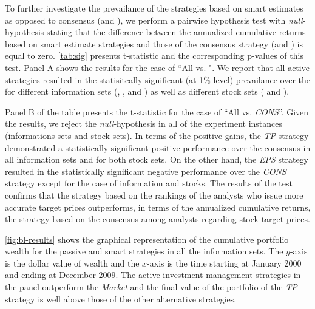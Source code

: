 \documentclass[a4paper,twoside,12pt,openright,notitlepage]{report}\usepackage[]{graphicx}\usepackage[]{color}
\begin{document}


To further investigate the prevailance  of the strategies based on smart estimates  as opposed to consensus (and \Market{}), we perform a pairwise hypothesis test with \emph{null}-hypothesis stating that the difference between the annualized cumulative returns based on smart estimate strategies and those of the consensus strategy (and \Market{}) is equal to zero. \ref{tab:sig} presents t-statistic and the corresponding p-values of this test. Panel A shows the results for the case of ``All vs. \Market{}". We report that all active strategies resulted in the statisitcally significant (at 1\% level) prevailance over the \Market{} for different information sets (\tr{}, \naive{}, and ) as well as different stock sets (\all{} and \same{}).

Panel B of the table presents the t-statistic for the case of ``All vs. \textit{CONS}''. Given the results, we reject the \emph{null}-hypothesis in all of the experiment instances (informations sets and stock sets). In terms of the positive gains, the \textit{TP} strategy demonstrated a statistically significant positive performance over the consensus in all information  sets and for both stock sets. On the other hand, the \textit{EPS} strategy resulted in the statistically significant negative performance over the \textit{CONS} strategy except for the case of  information and \all{} stocks. The results of the test confirms that the strategy based on the rankings of the analysts who issue more accurate target prices outperforms, in terms of the annualized cumulative returns, the strategy based on the consensus among analysts regarding stock target prices.



\ref{fig:bl-results} shows the graphical representation of the cumulative portfolio wealth for  the passive and smart strategies in all the information sets. The $y$-axis is the dollar value of wealth and the $x$-axis is the time starting at January 2000 and ending at December  2009. The active investment management strategies in the \tr{} panel outperform the \emph{Market} and the final value  of the portfolio of the \textit{TP} strategy is well above those of the other alternative strategies.
\end{document}
